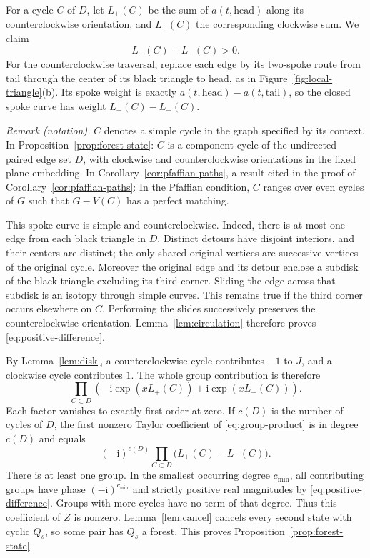 \documentclass[11pt]{article}
\theoremstyle{remark}
\newcommand{\ii}{\mathrm i}
\numberwithin{equation}{section}
\begin{document}
For a cycle \(C\) of \(D\), let \(L_+(C)\) be the sum
of \(a(t,\mathrm{head})\) along its counterclockwise
orientation, and \(L_-(C)\) the corresponding clockwise
sum. We claim
\begin{equation}\label{eq:positive-difference}
 L_+(C)-L_-(C)>0.
\end{equation}
For the counterclockwise traversal, replace each edge
by its two-spoke route from tail through the center of
its black triangle to head, as in Figure~\ref{fig:local-triangle}(b).
Its spoke weight is exactly
\(a(t,\mathrm{head})-a(t,\mathrm{tail})\), so the
closed spoke curve has weight \(L_+(C)-L_-(C)\).

\noindent\textit{Remark (notation).} $C$ denotes a simple cycle in the graph specified by its context. In Proposition~\ref{prop:forest-state}: $C$ is a component cycle of the undirected paired edge set $D$, with clockwise and counterclockwise orientations in the fixed plane embedding. In Corollary~\ref{cor:pfaffian-paths}, a result cited in the proof of Corollary~\ref{cor:pfaffian-paths}: In the Pfaffian condition, $C$ ranges over even cycles of $G$ such that $G-V(C)$ has a perfect matching.


This spoke curve is simple and counterclockwise. Indeed,
there is at most one edge from each black triangle in
\(D\). Distinct detours have disjoint interiors, and
their centers are distinct; the only shared original
vertices are successive vertices of the original cycle.
Moreover the original edge and its detour enclose a
subdisk of the black triangle excluding its third
corner. Sliding the edge across that subdisk is an
isotopy through simple curves. This remains true if
the third corner occurs elsewhere on \(C\). Performing
the slides successively preserves the counterclockwise
orientation. Lemma~\ref{lem:circulation} therefore proves
\eqref{eq:positive-difference}.



By Lemma~\ref{lem:disk}, a counterclockwise cycle
contributes \(-1\) to \(J\), and a clockwise cycle
contributes \(1\). The whole group contribution is
therefore
\begin{equation}\label{eq:group-product}
 \prod_{C\subset D}
 \left(-\ii\exp(xL_+(C))+\ii\exp(xL_-(C))\right).
\end{equation}
Each factor vanishes to exactly first order at zero.
If \(c(D)\) is the number of cycles of \(D\), the first
nonzero Taylor coefficient of \eqref{eq:group-product}
is in degree \(c(D)\) and equals
\begin{equation}\label{eq:leading-coefficient}
 (-\ii)^{c(D)}
       \prod_{C\subset D}\bigl(L_+(C)-L_-(C)\bigr).
\end{equation}
There is at least one group. In the smallest occurring
degree \(c_{\min}\), all contributing groups have phase
\((-\ii)^{c_{\min}}\) and strictly positive real
magnitudes by \eqref{eq:positive-difference}.
Groups with more cycles have no term of that degree.
Thus this coefficient of \(Z\) is nonzero.
Lemma~\ref{lem:cancel} cancels every second state with
cyclic \(Q_s\), so some pair has \(Q_s\) a forest.
This proves Proposition~\ref{prop:forest-state}.
\end{document}
